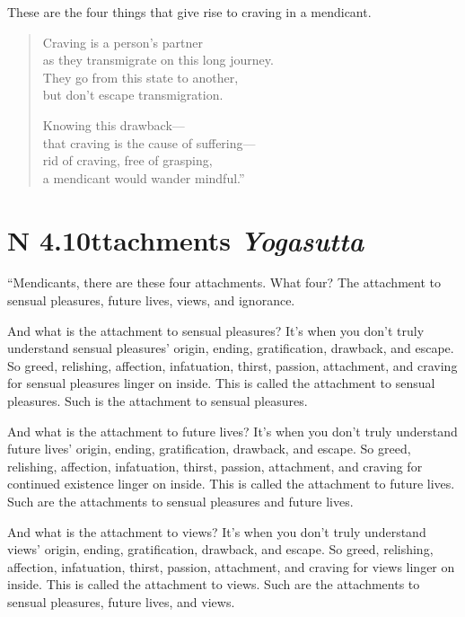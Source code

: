 \documentclass[12pt,openany]{book}%
\newcommand*{\suttatitleacronym}[1]{\smaller[2]{#1}\vspace*{.3em}}
\newcommand*{\suttatitletranslation}[1]{\linebreak{#1}}
\newcommand*{\suttatitleroot}[1]{\linebreak\smaller[2]\itshape{#1}}
\newcommand*{\tocacronym}[1]{\hspace*{-3.3em}{#1}\quad}
\newcommand*{\toctranslation}[1]{#1}
\newcommand*{\tocroot}[1]{(\textit{#1})}
\begin{document}
These are the four things that give rise to craving in a mendicant. 

\begin{verse}%
Craving is a person’s partner \\
as they transmigrate on this long journey. \\
They go from this state to another, \\
but don’t escape transmigration. 

Knowing this drawback—\\
that craving is the cause of suffering—\\
rid of craving, free of grasping, \\
a mendicant would wander mindful.” 

%
\end{verse}

%
\section*{{\suttatitleacronym AN 4.10}{\suttatitletranslation Attachments }{\suttatitleroot Yogasutta}}
\addcontentsline{toc}{section}{\tocacronym{AN 4.10} \toctranslation{Attachments } \tocroot{Yogasutta}}

“Mendicants, there are these four attachments. What four? The attachment to sensual pleasures, future lives, views, and ignorance. 

And what is the attachment to sensual pleasures? It’s when you don’t truly understand sensual pleasures’ origin, ending, gratification, drawback, and escape. So greed, relishing, affection, infatuation, thirst, passion, attachment, and craving for sensual pleasures linger on inside. This is called the attachment to sensual pleasures. Such is the attachment to sensual pleasures. 

And what is the attachment to future lives? It’s when you don’t truly understand future lives’ origin, ending, gratification, drawback, and escape. So greed, relishing, affection, infatuation, thirst, passion, attachment, and craving for continued existence linger on inside. This is called the attachment to future lives. Such are the attachments to sensual pleasures and future lives. 

And what is the attachment to views? It’s when you don’t truly understand views’ origin, ending, gratification, drawback, and escape. So greed, relishing, affection, infatuation, thirst, passion, attachment, and craving for views linger on inside. This is called the attachment to views. Such are the attachments to sensual pleasures, future lives, and views. 
\end{document}
